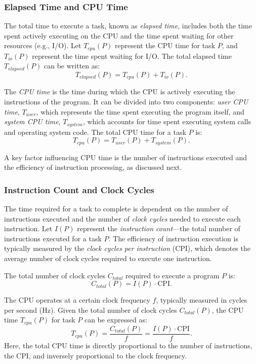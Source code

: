 \subsubsection{Elapsed Time and CPU Time}

The total time to execute a task, known as \emph{elapsed time}, includes both the time spent actively executing on the CPU and the time spent waiting for other resources (e.g., I/O). Let $T_{cpu}(P)$ represent the CPU time for task $P$, and $T_{io}(P)$ represent the time spent waiting for I/O. The total elapsed time $T_{elapsed}(P)$ can be written as:
\[
T_{elapsed}(P) = T_{cpu}(P) + T_{io}(P).
\]

The \emph{CPU time} is the time during which the CPU is actively executing the instructions of the program. It can be divided into two components: \emph{user CPU time}, $T_{user}$, which represents the time spent executing the program itself, and \emph{system CPU time}, $T_{system}$, which accounts for time spent executing system calls and operating system code. The total CPU time for a task $P$ is:
\[
T_{cpu}(P) = T_{user}(P) + T_{system}(P).
\]

A key factor influencing CPU time is the number of instructions executed and the efficiency of instruction processing, as discussed next.

\subsubsection{Instruction Count and Clock Cycles}

The time required for a task to complete is dependent on the number of instructions executed and the number of \emph{clock cycles} needed to execute each instruction. Let $I(P)$ represent the \emph{instruction count}—the total number of instructions executed for a task $P$. The efficiency of instruction execution is typically measured by the \emph{clock cycles per instruction} (CPI), which denotes the average number of clock cycles required to execute one instruction.

The total number of clock cycles $C_{total}$ required to execute a program $P$ is:
\[
C_{total}(P) = I(P) \cdot \text{CPI}.
\]

The CPU operates at a certain clock frequency $f$, typically measured in cycles per second (Hz). Given the total number of clock cycles $C_{total}(P)$, the CPU time $T_{cpu}(P)$ for task $P$ can be expressed as:
\[
T_{cpu}(P) = \frac{C_{total}(P)}{f} = \frac{I(P) \cdot \text{CPI}}{f}.
\]
Here, the total CPU time is directly proportional to the number of instructions, the CPI, and inversely proportional to the clock frequency.

